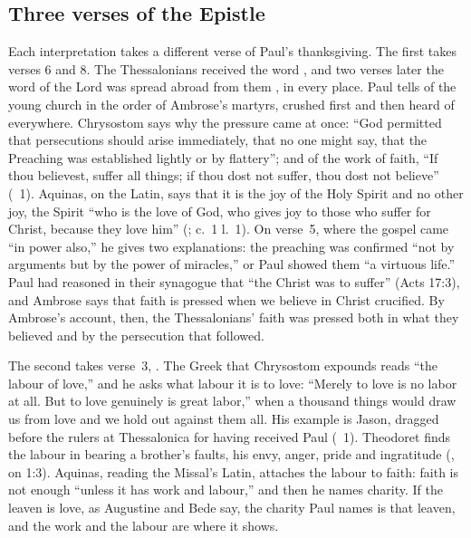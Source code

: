 \subsection{Three verses of the Epistle}

Each interpretation takes a different verse of Paul's thanksgiving. The first
takes verses 6 and 8. The Thessalonians received the word , and two verses later the word of the Lord was spread
abroad from them , in every place. Paul tells of the young church in the order
of Ambrose's martyrs, crushed first and then heard of everywhere. Chrysostom
says why the pressure came at once: ``God permitted that persecutions should
arise immediately, that no one might say, that the Preaching was established
lightly or by flattery''; and of the work of faith, ``If thou believest, suffer
all things; if thou dost not suffer, thou dost not believe'' (~1). Aquinas, on the Latin, says that it is the joy of the Holy
Spirit and no other joy, the Spirit ``who is the love of God, who gives joy to
those who suffer for Christ, because they love him'' (;  c.~1 l.~1). On verse~5, where the gospel came ``in power
also,'' he gives two explanations: the preaching was confirmed ``not by
arguments but by the power of miracles,'' or Paul showed them ``a virtuous
life.'' Paul had reasoned in their synagogue that ``the Christ was to
suffer'' (Acts 17:3), and Ambrose says that faith is pressed when we believe
in Christ crucified. By Ambrose's account, then, the Thessalonians' faith
was pressed both in what they believed and by the persecution that followed.

The second takes verse~3, . The Greek that Chrysostom expounds reads ``the labour of love,''
and he asks what labour it is to love: ``Merely to love is no labor at all. But
to love genuinely is great labor,'' when a thousand things would draw us from
love and we hold out against them all. His example is Jason, dragged before
the rulers at Thessalonica for having received Paul (~1). Theodoret finds the labour in bearing a brother's faults, his
envy, anger, pride and ingratitude (, on
1:3). Aquinas, reading the Missal's Latin, attaches the labour to faith:
faith is not enough ``unless it has work and labour,'' and then he names
charity. If the leaven is love, as Augustine and Bede say, the charity
Paul names is that leaven, and the work and the labour are where it shows.

